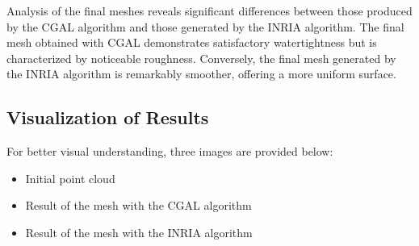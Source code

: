 \documentclass{article}
\begin{document}
\begin{itemize}
Analysis of the final meshes reveals significant differences between those produced by the CGAL algorithm and those generated by the INRIA algorithm. The final mesh obtained with CGAL demonstrates satisfactory watertightness but is characterized by noticeable roughness. Conversely, the final mesh generated by the INRIA algorithm is remarkably smoother, offering a more uniform surface.

\subsection{Visualization of Results}

For better visual understanding, three images are provided below:

\begin{itemize}
    \item Initial point cloud
    \item Result of the mesh with the CGAL algorithm
    \item Result of the mesh with the INRIA algorithm
\end{itemize}


\end{itemize}
\end{document}
